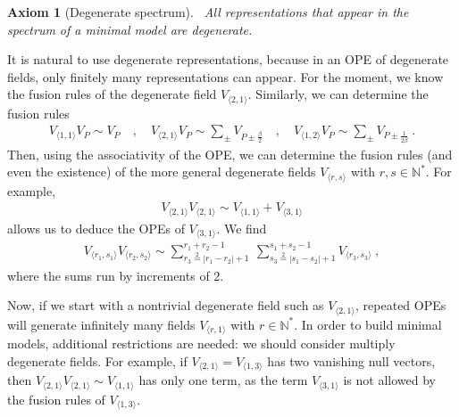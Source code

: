 \documentclass[12pt, a4paper]{article}
\theoremstyle{break}
\newtheorem{hyp}[exo]{Axiom}
\begin{document}
\begin{hyp}[Degenerate spectrum]
 ~\label{hyp:deg}
 All representations that appear in the spectrum of a minimal model are degenerate.
\end{hyp}
It is natural to use degenerate representations, because in an OPE of degenerate fields, only finitely many representations can appear. For the moment, we know the fusion rules of the degenerate field $V_{\langle 2,1\rangle}$. Similarly, we can determine the fusion rules
\begin{align}
V_{\langle 1,1\rangle} V_P \sim V_P \quad ,\quad 
 V_{\langle 2,1\rangle} V_P \sim \sum_\pm V_{P\pm \frac{\beta}{2}} \quad , \quad V_{\langle 1,2\rangle} V_P\sim \sum_\pm V_{P\pm \frac{1}{2\beta}}  \ . 
\end{align}
Then, using the associativity of the OPE, we can determine the fusion rules (and even the existence) of the more general degenerate fields $V_{\langle r,s\rangle}$ with $r,s\in\mathbb{N}^*$. For example, 
\begin{align}
 V_{\langle 2,1\rangle} V_{\langle 2,1\rangle} \sim V_{\langle 1,1\rangle} + V_{\langle 3,1\rangle} 
\end{align}
allows us to deduce the OPEs of $V_{\langle 3,1\rangle}$. We find 
 \begin{align}
 V_{\langle r_1,s_1 \rangle}V_{\langle r_2,s_2 \rangle} \sim \sum_{r_3\overset{2}{=}|r_1-r_2|+1}^{r_1+r_2-1}\ \sum_{s_3\overset{2}{=}|s_1-s_2|+1}^{s_1+s_2-1} V_{\langle r_3,s_3 \rangle}\ ,
\label{rrsr}
\end{align}
where the sums run by increments of $2$.

Now, if we start with a nontrivial degenerate field such as $V_{\langle 2,1\rangle}$, repeated OPEs will generate infinitely many fields $V_{\langle r,1\rangle}$ with $r\in\mathbb{N}^*$. In order to build minimal models, additional restrictions are needed: we should consider multiply degenerate fields. For example, if $V_{\langle 2, 1\rangle} = V_{\langle 1, 3\rangle}$ has two vanishing null vectors, then $V_{\langle 2, 1\rangle} V_{\langle 2, 1\rangle} \sim V_{\langle 1,1\rangle}$ has only one term, as the term $V_{\langle 3, 1\rangle}$ is not allowed by the fusion rules of $V_{\langle 1, 3\rangle}$.
\end{document}
